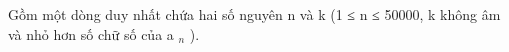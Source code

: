 Gồm một dòng duy nhất chứa hai số nguyên n và k (1 ≤ n ≤ 50000, k không âm và nhỏ hơn số chữ số của a $_ n $ ).